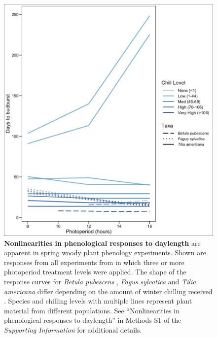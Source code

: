 \documentclass{article}
\begin{document}
\makeatletter
\renewcommand{\thefigure}{Box 1-\@arabic\c@figure}
\makeatother
\setcounter{figure}{0}
\begin{figure}[h]
\includegraphics{Photo_curv_version2blue.jpeg} 
\caption{\textbf{ Nonlinearities in phenological responses to daylength} are apparent in spring woody plant phenology experiments. Shown are responses from all experiments  from \citet{wolkovich2019}in which three or more photoperiod treatment levels were applied. The shape of the response curves for \textit{Betula pubescens} \citep{Caffarra:2011b}, \textit{Fagus sylvatica} \citep{Heide:1993a} and \textit{Tilia americana} \citep{Ashby:1962aa} differ depending on the amount of winter chilling received \citep[measured in Chill portions,][with darker blue indicating more chilling]{fishman1987}. Species and chilling levels with multiple lines represent plant material from different populations. See ``Nonlinearities in phenological responses to daylength'' in Methods S1 of the \emph{Supporting Information} for additional details.}

\label{fig:photocurve}
\end{figure}
\end{document}
